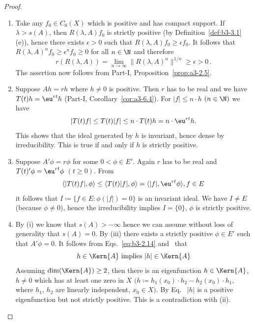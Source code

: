 \begin{proof} 
\begin{enumerate}[\upshape (i), wide, labelindent=.25em]
	\item 
	Take any $f_{0} \in C_{0}(X)$ which is positive and has compact support.
	If\/ $\lambda > s(A)$, then $R(\lambda,A)f_{0}$ is strictly positive (by Definition~\ref{def:b3-3.1}\,(e)), hence there exists $\epsilon > 0$ such that $R(\lambda,A)f_{0} \geq \epsilon f_{0}$.
	It follows that $R(\lambda,A)^nf_{0} \geq \epsilon^nf_{0} \geq 0$ for all $n \in \N$ and therefore
	\[
    r(R(\lambda,A)) = \lim_{n \to \infty}\|R(\lambda,A)^{n}\|^{1/n} \geq \epsilon > 0\,.
    \]
	The assertion now follows from Part-I, Proposition~\ref{prop:a3-2.5}.	

	\item 
	Suppose $Ah = rh$ where $h \neq 0$ is positive.
	Then $r$ has to be real and we have $T(t)h = \eu^{rt}h$ (Part-I, Corollary~\ref{cor:a3-6.4}).
	For $|f| \leq n\cdot h$ $(n \in \N)$ we have
	\begin{equation}\label{eq:b3-3.2}
		|T(t)f| \leq T(t)|f| \leq n\cdot T(t)h = n\cdot \eu^{rt}h.		
	\end{equation}
		This shows that the ideal generated by $h$ is invariant, hence dense by irreducibility.
	This is true if and only if\/ $h$ is strictly positive.
	
	\item 
	Suppose $A'\phi = r\phi$ for some $0 < \phi \in E'$.
	Again $r$ has to be real and $T(t)'\phi = \eu^{rt}\phi$ $(t \geq 0)$.
	From
	\begin{equation}\label{eq:b3-3.3}
	\langle|T(t)f|,\phi\rangle \leq \langle T(t)|f|,\phi\rangle = \langle|f|,\eu^{rt}\phi\rangle, f \in E			
	\end{equation}
	it follows that $I \coloneq \{f \in E \colon \phi(|f|) = 0\}$ is an invariant ideal.
	We have $I \neq E$ (because $\phi \neq 0$), hence the irreducibility implies $I = \{0\}$, \ie $\phi$ is strictly positive.
	
	\item 
	By (i) we know that $s(A) > -\infty$ hence we can assume without loss of generality that $s(A) = 0$.
	By (iii) there exists a strictly positive $\phi \in E'$ such that $A'\phi = 0$.
	It follows from Eqs.~\eqref{eq:b3-2.14} and~ that
	\begin{equation}\label{eq:b3-3.4}
	h \in \Kern{A} \text{ implies } |h| \in \Kern{A}
	\end{equation}
	Assuming $\dim(\Kern{A}) \geq 2$, then there is an eigenfunction $h \in \Kern{A}$, $h \neq 0$ which has at least one zero in $X$ $(h \coloneq h_{1}(x_{0})\cdot h_{2} - h_{2}(x_{0})\cdot h_{1}$, where $h_{1}$, $h_{2}$ are linearly independent, $x_{0} \in X)$.
	By Eq.~ $|h|$ is a positive eigenfunction but not strictly positive.
	This is a contradiction with (ii).
	

\end{enumerate}
\end{proof}
